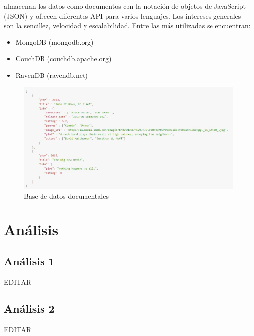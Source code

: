 \documentclass[preprint,12pt]{elsarticle}
\begin{document}
almacenan los datos como documentos con la notación de objetos de JavaScript (JSON) y ofrecen
diferentes API para varios lenguajes. Los intereses generales son la sencillez, velocidad y escalabilidad.
Entre las más utilizadas se encuentran: 
\begin{itemize}
\item MongoDB (mongodb.org)
\item CouchDB (couchdb.apache.org)
\item RavenDB (ravendb.net)
\end{itemize}
\begin{figure}[H]
	\begin{center}
		\includegraphics[width=15cm]{./IMAGENES/basededatos_2} 
		\caption{Base de datos documentales}
	\end{center}
\end{figure}


 



\section{Análisis}

\subsection{\textbf{Análisis 1}}
EDITAR\\

\subsection{\textbf{Análisis 2}}
EDITAR\\
\end{document}
